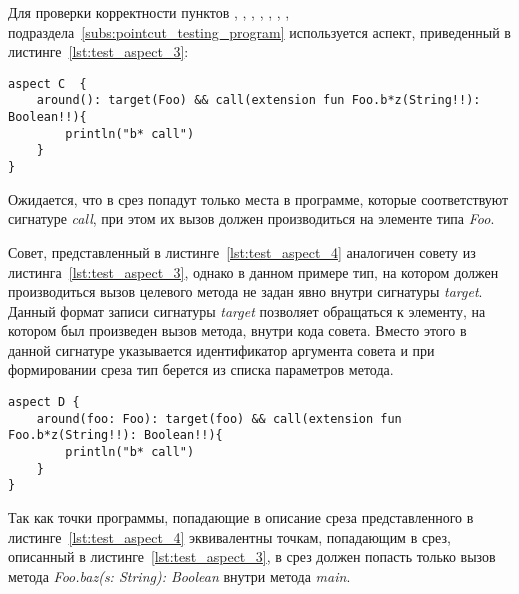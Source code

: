 Для проверки корректности пунктов \quotes{\ref{list:method_name_check}},
\quotes{\ref{list:class_name_check}},
\quotes{\ref{list:method_params_check}},
\quotes{\ref{list:method_modifiers_check}},
\quotes{\ref{list:method_extension_check}},
\quotes{\ref{list:method_return_value_check}},
\quotes{\ref{list:target_check}},
\quotes{\ref{list:logic_operations_check}} подраздела~\ref{subs:pointcut_testing_program} используется аспект, приведенный в листинге~\ref{lst:test_aspect_3}:
\begin{lstlisting}[style={java}, label={lst:test_aspect_3},
  caption={Пример тестового аспекта}]
aspect C  {
    around(): target(Foo) && call(extension fun Foo.b*z(String!!): Boolean!!){
        println("b* call")
    }
}
\end{lstlisting}

Ожидается, что в срез попадут только места в программе, которые соответствуют сигнатуре \textit{call}, при этом их вызов должен производиться на элементе типа \textit{Foo}.

Совет, представленный в листинге~\ref{lst:test_aspect_4} аналогичен совету из листинга~\ref{lst:test_aspect_3}, однако в данном примере тип, на котором должен производиться вызов целевого метода не задан явно внутри сигнатуры \textit{target}.
Данный формат записи сигнатуры \textit{target} позволяет обращаться к элементу, на котором был произведен вызов метода, внутри кода совета.
Вместо этого в данной сигнатуре указывается идентификатор аргумента совета и при формировании среза тип берется из списка параметров метода.
\begin{lstlisting}[style={java}, label={lst:test_aspect_4},
  caption={Пример тестового аспекта}]
aspect D {
    around(foo: Foo): target(foo) && call(extension fun Foo.b*z(String!!): Boolean!!){
        println("b* call")
    }
}
\end{lstlisting}
Так как точки программы, попадающие в описание среза представленного в листинге~\ref{lst:test_aspect_4} эквивалентны точкам, попадающим в срез, описанный в листинге~\ref{lst:test_aspect_3}, в срез должен попасть только вызов метода \textit{Foo.baz(s: String): Boolean} внутри метода \textit{main}.

